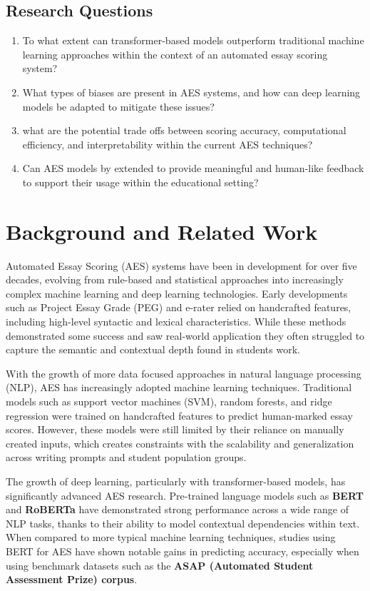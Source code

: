 \documentclass[11pt]{article}
\begin{document}
\subsection{Research Questions}
\begin{enumerate}
    \item To what extent can transformer-based models outperform traditional machine learning approaches within the context of an automated essay scoring system?
    \item What types of biases are present in AES systems, and how can deep learning models be adapted to mitigate these issues?
    \item what are the potential trade offs between scoring accuracy, computational efficiency, and interpretability within the current AES techniques?
    \item Can AES models by extended to provide meaningful and human-like feedback to support their usage within the educational setting?
\end{enumerate}

\section*{Background and Related Work}
Automated Essay Scoring (AES) systems have been in development for over five decades, evolving from rule-based and statistical 
approaches into increasingly complex machine learning and deep learning technologies. Early developments such as Project Essay 
Grade (PEG) and e-rater relied on handcrafted features, including high-level syntactic and lexical characteristics. While these 
methods demonstrated some success and saw real-world application they often struggled to capture the semantic and contextual 
depth found in students work.

With the growth of more data focused approaches in natural language processing (NLP), AES has increasingly adopted machine learning 
techniques. Traditional models such as support vector machines (SVM), random forests, and ridge regression were trained on 
handcrafted features to predict human-marked essay scores. However, these models were still limited by their reliance on manually 
created inputs, which creates constraints with the scalability and generalization across writing prompts and student population 
groups.

The growth of deep learning, particularly with transformer-based models, has significantly advanced AES research. Pre-trained 
language models such as \textbf{BERT} and \textbf{RoBERTa} have demonstrated strong performance across a wide range of NLP tasks, thanks to their 
ability to model contextual dependencies within text. When compared to more typical machine learning techniques, studies using BERT 
for AES have shown notable gains in predicting accuracy, especially when using benchmark datasets such as the \textbf{ASAP (Automated 
Student Assessment Prize) corpus}.
\end{document}
